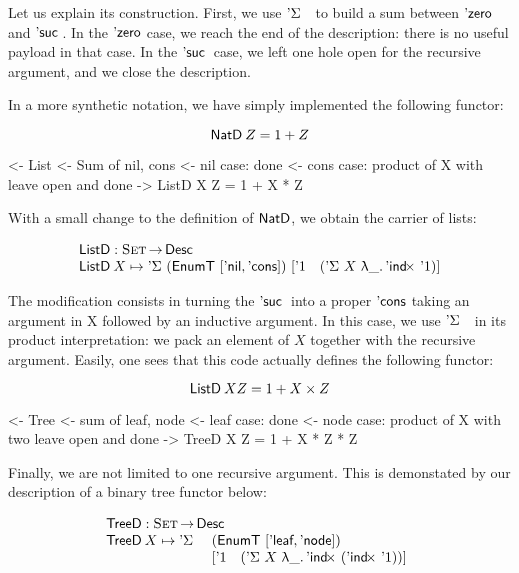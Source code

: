 Let us explain its construction. First, we use $\DSigma{}{}$ to build
a sum between $\NatZero$ and $\NatSuc{}$. In the $\NatZero$ case, we
reach the end of the description: there is no useful payload in that
case. In the $\NatSuc{}$ case, we left one hole open for the recursive
argument, and we close the description.

In a more synthetic notation, we have simply implemented the following
functor:

\[    \NatD\: Z = 1 + Z    \]



\begin{wstructure}
<- List
    <- Sum of nil, cons
    <- nil case: done
    <- cons case: product of X with leave open and done
    -> ListD X Z = 1 + X * Z
\end{wstructure}

With a small change to the definition of $\NatD$, we obtain the
carrier of lists:

\[\stk{
\ListD : \Set \To \Desc \\
\ListD \: X \mapsto \DSigma{(\EnumT [ \ListNil, \ListCons ])}
                           {[ \DUnit \quad (\DSigma{X}{\LAM{\_} \DIndx{\DUnit}}) ]}
}\]

The modification consists in turning the $\NatSuc{}$ into a proper
$\ListCons$ taking an argument in X followed by an inductive
argument. In this case, we use $\DSigma{}{}$ in its product
interpretation: we pack an element of $X$ together with the recursive
argument. Easily, one sees that this code actually defines the
following functor:

\[    \ListD\: X Z = 1 + X \times Z     \]

\begin{wstructure}
<- Tree
    <- sum of leaf, node
    <- leaf case: done
    <- node case: product of X with two leave open and done
    -> TreeD X Z = 1 + X * Z * Z
\end{wstructure}

Finally, we are not limited to one recursive argument. This is
demonstated by our description of a binary tree functor below:

\[\stk{
\TreeD : \Set \To \Desc \\
\begin{array}{@{}ll}
\TreeD \: X \mapsto \DSigma{ & (\EnumT [ \TreeLeaf, \TreeNode ]) \\}
                           { & [ \DUnit \quad (\DSigma{X}{\LAM{\_} \DIndx{(\DIndx{\DUnit})}}) ]}
\end{array}
}\]

